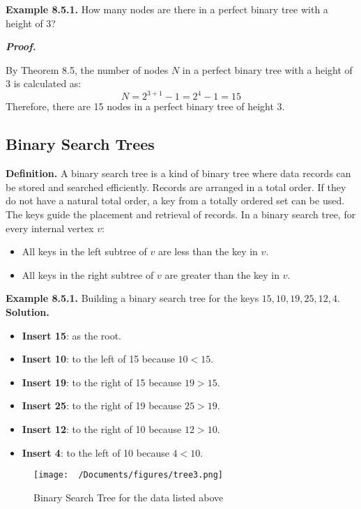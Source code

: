 \documentclass{report}
\begin{document}
\bigbreak \noindent
\textbf{Example 8.5.1.} How many nodes are there in a perfect binary tree with a height of 3? \vspace{2mm}

\noindent \textbf{\textit{Proof.}} \vspace{2mm}

By Theorem 8.5, the number of nodes \( N \) in a perfect binary tree with a height of 3 is calculated as:
\[
N = 2^{3+1} - 1 = 2^4 - 1 = 15
\]
Therefore, there are 15 nodes in a perfect binary tree of height 3.

\subsection{Binary Search Trees}

\textbf{Definition.} A binary search tree is a kind of binary tree where data records can be stored and searched efficiently. Records are arranged in a total order. If they do not have a natural total order, a key from a totally ordered set can be used. The keys guide the placement and retrieval of records.
\bigbreak \noindent
\noindent In a binary search tree, for every internal vertex \( v \):
\begin{itemize}
    \item All keys in the left subtree of \( v \) are less than the key in \( v \).
    \item All keys in the right subtree of \( v \) are greater than the key in \( v \).
\end{itemize}
\bigbreak \noindent
\textbf{Example 8.5.1.} Building a binary search tree for the keys \( 15, 10, 19, 25, 12, 4 \).
\bigbreak \noindent
\textbf{Solution.} 
\begin{itemize}
    \item \textbf{Insert 15}: as the root.
    \item \textbf{Insert 10}: to the left of 15 because \( 10 < 15 \).
    \item \textbf{Insert 19}: to the right of 15 because \( 19 > 15 \).
    \item \textbf{Insert 25}: to the right of 19 because \( 25 > 19 \).
    \item \textbf{Insert 12}: to the right of 10 because \( 12 > 10 \).
    \item \textbf{Insert 4}: to the left of 10 because \( 4 < 10 \).
\end{itemize}

\begin{figure}[ht]
    \centering
    \texttt{[image: ~/Documents/figures/tree3.png]}
    \caption{Binary Search Tree for the data listed above}
\end{figure}
\end{document}
